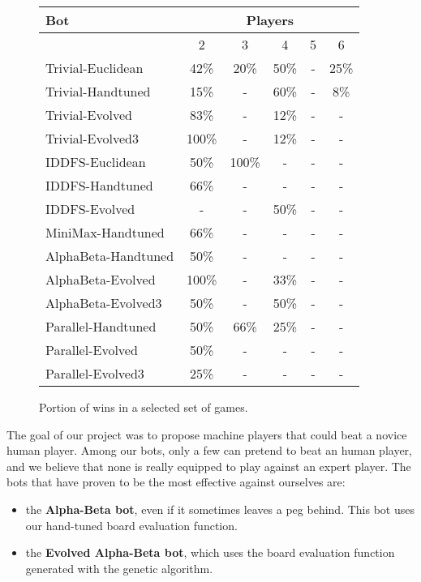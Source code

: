 \begin{figure}
\centering
\begin{tabular}{ | l | c | c | c | c | c | }
\hline
Bot & \multicolumn{5}{|c|}{Players} \\
\hline
& 2 & 3 & 4 & 5 & 6 \\
\hline
Trivial-Euclidean & 42\% & 20\% & 50\% & - & 25\% \\
\hline
Trivial-Handtuned & 15\% & - & 60\% & - & 8\% \\
\hline
Trivial-Evolved & 83\% & - & 12\% & - & - \\
\hline
Trivial-Evolved3 & 100\% & - & 12\% & - & - \\
\hline
IDDFS-Euclidean & 50\% & 100\% & - & - & - \\
\hline
IDDFS-Handtuned & 66\% & - & - & - & - \\
\hline
IDDFS-Evolved & - & - & 50\% & - & - \\
\hline
MiniMax-Handtuned & 66\% & - & - & - & - \\
\hline
AlphaBeta-Handtuned & 50\% & - & - & - & - \\
\hline
AlphaBeta-Evolved & 100\% & - & 33\% & - & - \\
\hline
AlphaBeta-Evolved3 & 50\% & - & 50\% & - & - \\
\hline
Parallel-Handtuned & 50\% & 66\% & 25\% & - & - \\
\hline
Parallel-Evolved & 50\% & - & - & - & - \\
\hline
Parallel-Evolved3 & 25\% & - & - & - & - \\
\hline
\end{tabular}
\caption{Portion of wins in a selected set of games.}
\label{stats}
\end{figure}



The goal of our project was to propose machine players that could beat
a novice human player. Among our bots, only a few can pretend to beat
an human player, and we believe that none is really equipped to play
against an expert player. The bots that have proven to be the most
effective against ourselves are:

\begin{itemize}
  \item the \textbf{Alpha-Beta bot}, even if it sometimes leaves a peg behind.
        This bot uses our hand-tuned board evaluation function.
  \item the \textbf{Evolved Alpha-Beta bot}, which uses the board evaluation
        function generated with the genetic algorithm.
\end{itemize}

